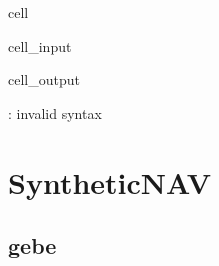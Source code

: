 \documentclass[letterpaper,10pt,english]{jupyterBook}
\begin{document}
\begin{sphinxuseclass}{cell}\begin{sphinxVerbatimInput}

\begin{sphinxuseclass}{cell_input}
\begin{sphinxVerbatim}[commandchars=\\\{\}]
  
     
     
     
\end{sphinxVerbatim}

\end{sphinxuseclass}\end{sphinxVerbatimInput}
\begin{sphinxVerbatimOutput}

\begin{sphinxuseclass}{cell_output}
\begin{sphinxVerbatim}[commandchars=\\\{\}]
      
: invalid syntax
\end{sphinxVerbatim}

\end{sphinxuseclass}\end{sphinxVerbatimOutput}

\end{sphinxuseclass}
\sphinxstepscope


\chapter{SyntheticNAV}
\label{\detokenize{src/test/SyntheticNAV:syntheticnav}}\label{\detokenize{src/test/SyntheticNAV::doc}}

\section{gebe}
\label{\detokenize{src/test/SyntheticNAV:gebe}}
\end{document}
